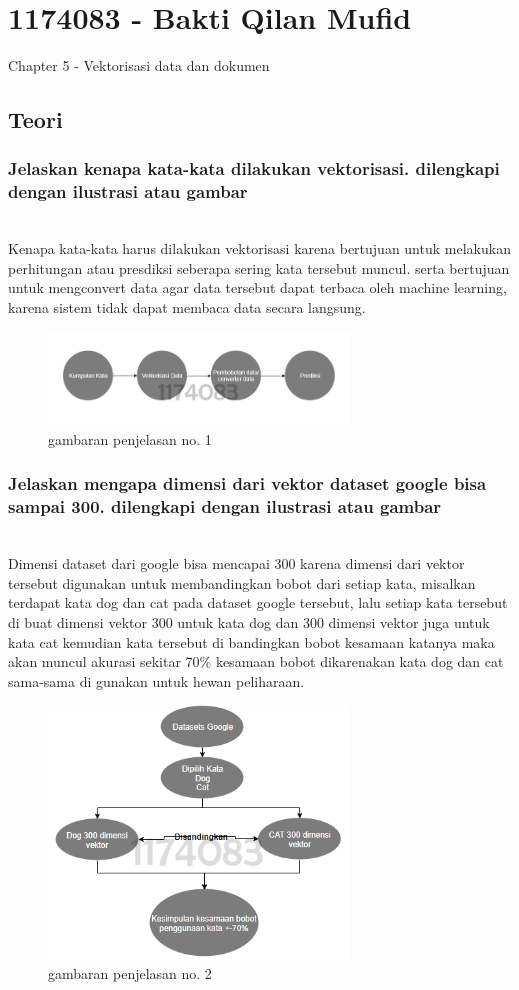 \section{1174083 - Bakti Qilan Mufid}
Chapter 5 - Vektorisasi data dan dokumen
\subsection{Teori}
\subsubsection{Jelaskan kenapa kata-kata dilakukan vektorisasi. dilengkapi dengan ilustrasi atau gambar}
\hfill\\
Kenapa kata-kata harus dilakukan vektorisasi karena bertujuan untuk melakukan perhitungan atau presdiksi seberapa sering kata tersebut muncul. serta bertujuan untuk mengconvert data agar data tersebut dapat terbaca oleh machine learning, karena sistem tidak dapat membaca data secara langsung.

\begin{figure}[H]
	\centering
	\includegraphics[width=8cm]{figures/1174083/figures5/1.png}
	\caption{gambaran penjelasan no. 1}
\end{figure}

\subsubsection{Jelaskan mengapa dimensi dari vektor dataset google bisa sampai 300. dilengkapi dengan ilustrasi atau gambar}
\hfill\\
Dimensi dataset dari google bisa mencapai 300 karena dimensi dari vektor tersebut digunakan untuk membandingkan bobot dari setiap kata, misalkan terdapat kata dog dan cat pada dataset google tersebut, lalu setiap kata tersebut di buat dimensi vektor 300 untuk kata dog dan 300 dimensi vektor juga untuk kata cat kemudian kata tersebut di bandingkan bobot kesamaan katanya maka akan muncul akurasi sekitar 70\% kesamaan bobot dikarenakan kata dog dan cat sama-sama di gunakan untuk hewan peliharaan.
\begin{figure}[H]
	\centering
	\includegraphics[width=8cm]{figures/1174083/figures5/2.png}
	\caption{gambaran penjelasan no. 2}
\end{figure}

